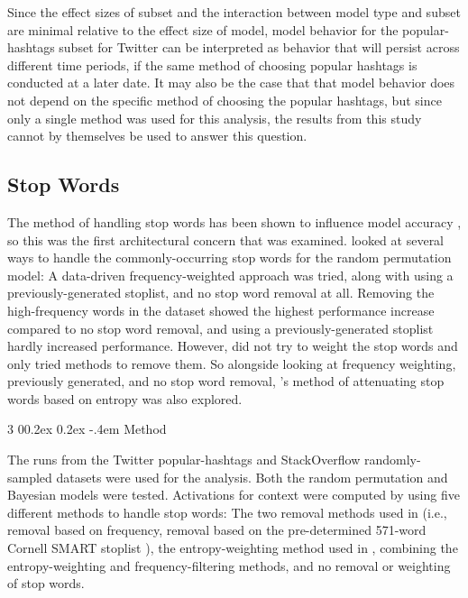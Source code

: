 \documentclass[man,floatsintext,donotrepeattitle]{apa6}
\makeatletter
\renewcommand{\subsubsection}{%
  \@startsection
  {subsubsection}%
  {3}%
  {\parindent}%
  {0\baselineskip \@plus 0.2ex \@minus 0.2ex}%
  {-.4em}%
  {\normalfont\normalsize\bfseries\addperi}}
\makeatother
\begin{document}
Since the effect sizes of subset and the interaction between model type and subset are minimal relative to the effect size of model,
model behavior for the popular-hashtags subset for Twitter can be interpreted as behavior that will persist across different time periods,
if the same method of choosing popular hashtags is conducted at a later date.
It may also be the case that that model behavior does not depend on the specific method of choosing the popular hashtags, but since only a single method was used for this analysis,
the results from this study cannot by themselves be used to answer this question.

\subsection{Stop Words}

The method of handling stop words has been shown to influence model accuracy \parencite{Sahlgren2008,Stanley2013}, so this was the first architectural concern that was examined.
\textcite{Sahlgren2008} looked at several ways to handle the commonly-occurring stop words for the random permutation model:
A data-driven frequency-weighted approach was tried, along with using a previously-generated stoplist, and no stop word removal at all.
Removing the high-frequency words in the dataset showed the highest performance increase compared to no stop word removal, and using a previously-generated stoplist hardly increased performance.
However, \citeauthor{Sahlgren2008} did not try to weight the stop words and only tried methods to remove them.
So alongside looking at frequency weighting, previously generated, and no stop word removal, \textcite{Stanley2013}'s method of attenuating stop words based on entropy was also explored.

\subsubsection{Method}

The runs from the Twitter popular-hashtags and StackOverflow randomly-sampled datasets were used for the analysis.
Both the random permutation and Bayesian models were tested.
Activations for context were computed by using five different methods to handle stop words:
The two removal methods used in \textcite{Sahlgren2008}
(i.e., removal based on frequency, removal based on the pre-determined 571-word Cornell SMART stoplist \parencite{Salton1988}),
the entropy-weighting method used in \textcite{Stanley2013},
combining the entropy-weighting and frequency-filtering methods,
and no removal or weighting of stop words.
\end{document}
